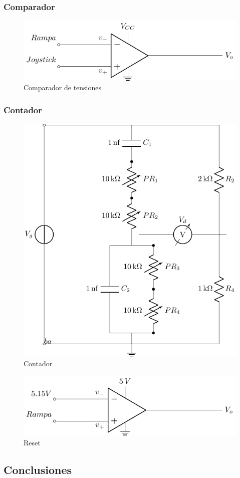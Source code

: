 \subsubsection{Comparador}

\begin{figure}[H]
\centering
\includegraphics[scale=0.8]{Ejercicio8/Circuitos/Comparador.pdf}
\caption{Comparador de tensiones}
\label{fig:Comparador}
\end{figure}

\subsubsection{Contador}

\begin{figure}[H]
\centering
\includegraphics[scale=0.8]{Ejercicio8/Circuitos/Contador&Display.pdf}
\caption{Contador}
\label{fig:Contador&Display}
\end{figure}

\begin{figure}[H]
\centering
\includegraphics[scale=0.8]{Ejercicio8/Circuitos/Reset.pdf}
\caption{Reset}
\label{fig:Reset}
\end{figure}





\subsection{Conclusiones}